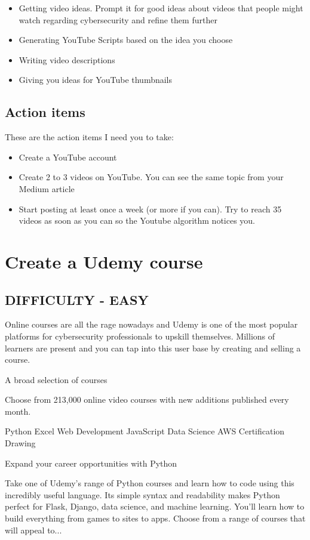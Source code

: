 \documentclass[11pt]{article}
\begin{document}
\begin{itemize}
\item Getting video ideas. Prompt it for good ideas about videos that people might watch regarding cybersecurity and refine them further
\item Generating YouTube Scripts based on the idea you choose
\item Writing video descriptions
\item Giving you ideas for YouTube thumbnails
\end{itemize}

\subsection*{Action items}
These are the action items I need you to take:

\begin{itemize}
\item Create a YouTube account
\item Create 2 to 3 videos on YouTube. You can see the same topic from your Medium article
\item Start posting at least once a week (or more if you can). Try to reach 35 videos as soon as you can so the Youtube algorithm notices you.
\end{itemize}

\section*{Create a Udemy course}
\subsection*{DIFFICULTY - EASY}
Online courses are all the rage nowadays and Udemy is one of the most popular platforms for cybersecurity professionals to upskill themselves. Millions of learners are present and you can tap into this user base by creating and selling a course.

A broad selection of courses

Choose from 213,000 online video courses with new additions published every month.

Python Excel Web Development JavaScript Data Science AWS Certification Drawing

Expand your career opportunities with Python

Take one of Udemy's range of Python courses and learn how to code using this incredibly useful language. Its simple syntax and readability makes Python perfect for Flask, Django, data science, and machine learning. You'll learn how to build everything from games to sites to apps. Choose from a range of courses that will appeal to...
\end{document}
